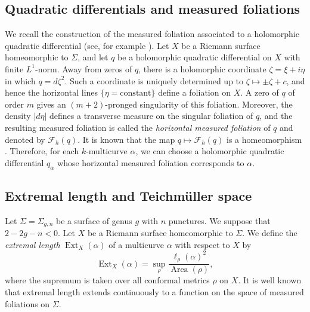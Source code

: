 \documentclass[a4paper,11pt]{amsart}
\numberwithin{equation}{section}
\theoremstyle{definition}
\DeclareMathOperator{\Ext}{Ext}
\DeclareMathOperator{\Area}{Area}
\begin{document}
\subsection{Quadratic differentials and measured foliations}

We recall the construction of the measured foliation associated to a holomorphic quadratic differential (see, for example \cite{farb2012primer}).
Let $X$ be a Riemann surface homeomorphic to $\Sigma$, and
let  $q$ be a holomorphic quadratic differential on $X$ with finite $L^1$-norm.
Away from zeros of $q$, there is a holomorphic coordinate $\zeta=\xi+i\eta$ in which $q=d\zeta^2$.
Such a coordinate is uniquely determined up to $\zeta \mapsto \pm \zeta+c$, and hence the horizontal lines $\{\eta=\text{constant}\}$ define a foliation on $X$.
A zero of $q$ of order $m$ gives an $(m+2)$-pronged singularity of this foliation.
Moreover, the density $|d\eta|$ defines a transverse measure on the singular foliation of $q$, and the resulting measured foliation is called the \emph{horizontal measured foliation} of $q$ and denoted by $\mathcal{F}_h(q)$.
It is known that the map $q\mapsto \mathcal{F}_h(q)$ is a homeomorphism \cite{hubbard1979quadratic}.
Therefore, for each $k$-multicurve $\alpha$, we can choose a holomorphic quadratic differential $q_\alpha$ whose horizontal measured foliation corresponds to $\alpha$.


\subsection{Extremal length and Teichmüller space}
Let $\Sigma=\Sigma_{g,n}$  be a surface of genus $g$ with $n$ punctures.
We suppose that $2-2g-n<0$.
Let $X$ be a Riemann surface homeomorphic to $\Sigma$.
We define the \emph{extremal length} $\Ext_X(\alpha)$ of a multicurve $\alpha$ with respect to $X$ by
\begin{equation*}
    \Ext_X(\alpha) = \sup_{\rho} \frac{\ell_\rho(\alpha)^2}{\Area(\rho)},
\end{equation*}
where the supremum is taken over all conformal metrics $\rho$ on $X$.
It is well known that extremal length extends continuously to a function on the space of measured foliations on $\Sigma$.
\end{document}
